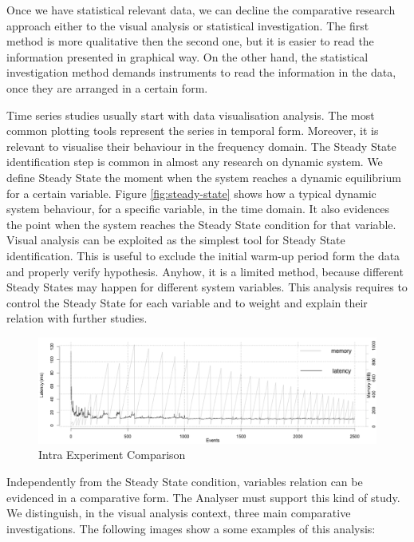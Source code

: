 Once we have statistical relevant data, we can decline the comparative research approach either to the visual analysis or statistical investigation. The first method is more qualitative then the second one, but it is easier to read the information presented in graphical way. On the other hand, the statistical investigation method demands instruments to read the information in the data, once they are arranged in a certain form.

Time series studies usually start with data visualisation analysis. The most common  plotting tools represent the series in temporal form. Moreover, it is relevant to visualise their behaviour in the frequency domain. The Steady State identification step is common in almost any research on dynamic system. We define Steady State the moment when the system reaches a dynamic equilibrium for a certain variable. Figure \ref{fig:steady-state} shows how a typical dynamic system behaviour, for a specific variable, in the time domain. It also evidences the point when the system reaches the Steady State condition for that variable. Visual analysis can be exploited as the simplest tool for Steady State identification. This is useful to exclude the initial warm-up period form the data and properly verify hypothesis. Anyhow, it is a limited method, because different Steady States may happen for different system variables. This analysis requires to control the Steady State for each variable and to weight and explain their relation with further studies.

\begin{figure}[tbh]
  \centering
	\includegraphics[width=0.80\linewidth]{images/comp-intra}
	\caption{Intra Experiment Comparison} 
  	\label{fig:comp-intra}
\end{figure}

Independently from the Steady State condition, variables relation can be evidenced in a comparative form. The Analyser must support this kind of study. We distinguish, in the visual analysis context, three main comparative investigations. The following images show a some examples of this analysis:

